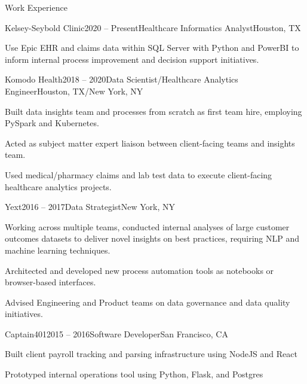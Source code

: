 \documentclass{resume} %
\begin{document}

\begin{rSection}{Work Experience}
\begin{rSubsection}{Kelsey-Seybold Clinic}{2020 -- Present}{Healthcare Informatics Analyst}{Houston, TX}
\item Use Epic EHR and claims data within SQL Server with Python and PowerBI to inform internal process improvement and decision support initiatives.

\end{rSubsection}
\begin{rSubsection}{Komodo Health}{2018 -- 2020}{Data Scientist/Healthcare Analytics Engineer}{Houston, TX/New York, NY}
\item Built data insights team and processes from scratch as first team hire, employing PySpark and Kubernetes.
\item Acted as subject matter expert liaison between client-facing teams and insights team.
\item Used medical/pharmacy claims and lab test data to execute client-facing healthcare analytics projects.

\end{rSubsection}
\begin{rSubsection}{Yext}{2016 -- 2017}{Data Strategist}{New York, NY}
\item Working across multiple teams, conducted internal analyses of large customer outcomes datasets to deliver novel insights on best practices, requiring NLP and machine learning techniques.
\item Architected and developed new process automation tools as notebooks or browser-based interfaces.
\item Advised Engineering and Product teams on data governance and data quality initiatives.

\end{rSubsection}

\begin{rSubsection}{Captain401}{2015 -- 2016}{Software Developer}{San Francisco, CA}
\item Built client payroll tracking and parsing infrastructure using NodeJS and React
\item Prototyped internal operations tool using Python, Flask, and Postgres
\end{rSubsection}


\end{rSection}
\end{document}
